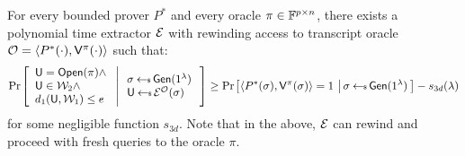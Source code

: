 \begin{lemma}[Soundness]\label{lem:proximity3d_sound}
For every bounded prover $P^\ast$ and every oracle $\pi\in \mathbb{F}^{p\times n}$,
there exists a polynomial time extractor $\mathcal{E}$ with rewinding access to
transcript oracle $\mathcal{O}=\langle P^\ast(\cdot),\mathsf{V}^{\pi}(\cdot)\rangle$
such that:
\begin{align*}
\condprob{
\begin{array}{l}
\ewit=\open(\pi) \wedge \\
\ewit\in \mc{W}_2\wedge \\
d_1(\ewit,\mc{W}_1)\leq e
\end{array}
}{
\begin{array}{l}
\sigma\sample \gen(\secparam)\\
\ewit\sample \extr^{\mc{O}}(\sigma)
\end{array}
}\geq \condprob{\langle
P^\ast(\sigma),\verifier^\pi(\sigma)\rangle=1}{\sigma\sample
\gen(\secparam)}-s_{3d}(\secpar)
\end{align*}
for some negligible function $s_{3d}$. Note that in the above, $\mathcal{E}$ can
rewind and proceed with fresh queries to the oracle $\pi$. 	
\end{lemma}
